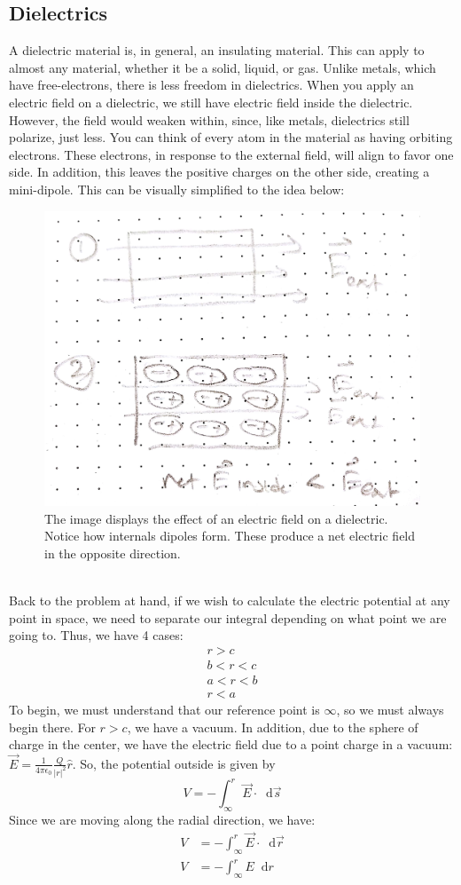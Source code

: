 \documentclass{article}
\newcommand*\dif{\mathop{}\!\mathrm{d}}
\begin{document}
\subsection{Dielectrics}
A dielectric material is, in general, an insulating material. This can apply to almost any material, whether it be a solid, liquid, or gas. Unlike metals, which have free-electrons, there is less freedom in dielectrics. When you apply an electric field on a dielectric, we still have electric field inside the dielectric. However, the field would weaken within, since, like metals, dielectrics still polarize, just less. You can think of every atom in the material as having orbiting electrons. These electrons, in response to the external field, will align to favor one side. In addition, this leaves the positive charges on the other side, creating a mini-dipole. This can be visually simplified to the idea below:
\begin{figure}[ht]
\center
\includegraphics[width=.3\textwidth]{images/Week2pic2.jpg}
\caption{The image displays the effect of an electric field on a dielectric. Notice how internals dipoles form. These produce a net electric field in the opposite direction.}
\end{figure}
\\
Back to the problem at hand, if we wish to calculate the electric potential at any point in space, we need to separate our integral depending on what point we are going to. Thus, we have 4 cases:
\begin{align*}
r > c\\
b < r < c\\
a < r < b\\
r < a
\end{align*}
To begin, we must understand that our reference point is $\infty$, so we must always begin there. For $r > c$, we have a vacuum. In addition, due to the sphere of charge in the center, we have the electric field due to a point charge in a vacuum: $\vec{E} = \frac{1}{4\pi\epsilon_0}\frac{Q}{|r|^2}\hat{r}$. So, the potential outside is given by $$V = -\int_\infty^r \vec{E} \cdot \dif \vec{s}$$Since we are moving along the radial direction, we have:
\begin{align*}
V &= -\int_\infty^r \vec{E} \cdot \dif \vec{r}\\
V &= -\int_\infty^r E \dif r
\end{align*}
\end{document}
